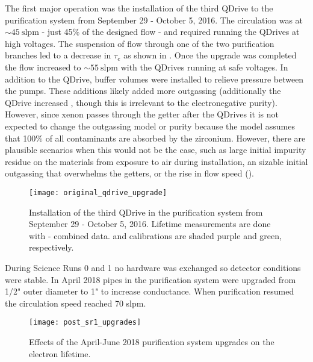 The first major operation was the installation of the third QDrive to the purification system from September 29 - October 5, 2016.  The
circulation was at ${\sim} 45\ \mathrm{slpm}$ - just 45\% of the designed flow - and required running the QDrives at high voltages.  The
suspension of flow through one of the two purification branches led to a decrease in $\tau_e$ as shown in
.  Once the upgrade was completed the flow increased to
${\sim}55\ \mathrm{slpm}$ with
the QDrives running at safe voltages.  In addition to the QDrive, buffer volumes were installed to relieve pressure between
the pumps.  These additions likely added more outgassing
(additionally the QDrive increased , though this is irrelevant to the electronegative purity).  However, since xenon passes
through the
getter after the QDrives it is not expected to change the outgassing model or purity because the model assumes that 100\% of all
contaminants are
absorbed by the zirconium.  However, there are plausible scenarios when this would not be the case, such as large initial impurity residue
on the materials from exposure to air during installation, an sizable initial outgassing that overwhelms the getters, or the rise
in flow speed ().

\begin{figure}
\centering
\texttt{[image: original\_qdrive\_upgrade]}
\caption{Installation of the third QDrive in the purification system from September 29 - October 5, 2016.  Lifetime measurements are done
with - combined data.   and \ambe calibrations are shaded purple and green, respectively.}
\label{fig:electron_lifetime_model_ops_original_qdrive_upgrade}
\end{figure}

During Science Runs 0 and 1 no hardware was exchanged so detector conditions were stable.  In April 2018 pipes in the purification
system were upgraded from 1/2" outer diameter to 1" to increase conductance.  When purification resumed the circulation speed reached
70 slpm.

\begin{figure}
\centering
\texttt{[image: post\_sr1\_upgrades]}
\caption{Effects of the April-June 2018 purification system upgrades on the electron lifetime.}
\label{fig:electron_lifetime_model_ops_post_sr1}
\end{figure}

